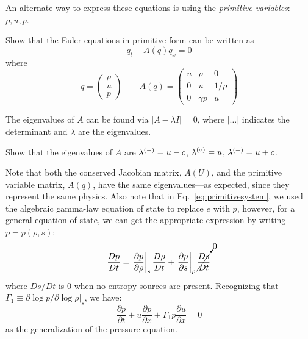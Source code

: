 An alternate way to express these equations is using the {\em
  primitive variables}: $\rho, u, p$.
\begin{exercise}
{Show that the Euler equations in primitive form can
  be written as
\begin{equation}
q_t + A(q) q_x = 0
\end{equation}
where
\begin{equation}
q = \left ( \begin{array}{c} \rho \\ u \\ p \end{array} \right )
%
\qquad
A(q) = \left ( \begin{array}{ccc} u  & \rho     & 0 \\
                                  0  &  u       & 1/\rho \\
                                  0  & \gamma p & u \end{array} \right )
\label{eq:primitivesystem}
\end{equation}
}
\end{exercise}
%
The eigenvalues of $A$ can be found via $| A - \lambda I | = 0$,
where $|\ldots|$ indicates the determinant and $\lambda$ are the eigenvalues.
\begin{exercise}
{
Show that the eigenvalues of $A$ are $\lambda^{(-)} = u -c$, $\lambda^{(\circ)} = u$, $\lambda^{(+)} = u+c$.
}
\end{exercise}
Note that both the conserved Jacobian matrix, $A(U)$, and the
primitive variable matrix, $A(q)$, have the same eigenvalues---as
expected, since they represent the same physics.  Also note that in
Eq.~\ref{eq:primitivesystem}, we used the algebraic gamma-law equation
of state to replace $e$ with $p$, however, for a general equation of state,
we can get the appropriate expression by writing $p = p(\rho, s)$:
\begin{equation}
\frac{Dp}{Dt} = \left . \frac{\partial p}{\partial \rho} \right |_s
     \frac{D\rho}{Dt} +
     \left . \frac{\partial p}{\partial s} \right |_\rho
     \cancelto{0}{\frac{Ds}{Dt}}
\end{equation}
where $Ds/Dt$ is $0$ when no entropy sources are present.  Recognizing
that $\Gamma_1 \equiv \partial \log p/\partial \log \rho |_s$, we have:
\begin{equation}
\frac{\partial p}{\partial t} + u \frac{\partial p}{\partial x} 
  + \Gamma_1 p \frac{\partial u}{\partial x} = 0
\end{equation}
as the generalization of the pressure equation.

